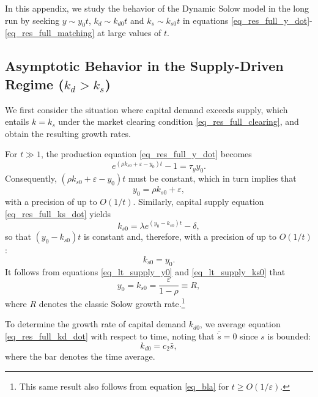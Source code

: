 
In this appendix, we study the behavior of the Dynamic Solow model in the long run by seeking $y \sim y_0 t$, $k_d \sim k_{d0} t$ and $k_s \sim k_{s0} t$ in equations \eqref{eq_res_full_y_dot}-\eqref{eq_res_full_matching} at large values of $t$.

\subsection{Asymptotic Behavior in the Supply-Driven Regime ($k_d>k_s$)}\label{subsec_supply}
We first consider the situation where capital demand exceeds supply, which entails $k=k_{s}$ under the market clearing condition \eqref{eq_res_full_clearing}, and obtain the resulting growth rates. 

For $t\gg1$, the production equation \eqref{eq_res_full_y_dot} becomes
\begin{equation}
	e^{(\rho k_{s0}+\varepsilon - y_0) t} - 1 = \tau_y y_0.
\end{equation}
Consequently, $(\rho k_{s0} + \varepsilon - y_0 )t$ must be constant, which in turn implies that 
\begin{equation}\label{eq_lt_supply_y0}
	y_0 = \rho k_{s0} + \varepsilon,
\end{equation}
with a precision of up to $O(1/t)$. Similarly, capital supply equation \eqref{eq_res_full_ks_dot} yields
\begin{equation}
	k_{s0} = \lambda e^{(y_0-k_{s0})t} - \delta,
\end{equation}
so that $(y_0 - k_{s0})t$ is constant and, therefore, with a precision of up to $O(1/t)$:
\begin{equation}\label{eq_lt_supply_ks0}
    k_{s0} = y_0.
\end{equation}
It follows from equations \ref{eq_lt_supply_y0} and \ref{eq_lt_supply_ks0} that
\begin{equation}\label{y0_solow}
	y_0 = k_{s0} = \frac{\varepsilon}{1-\rho} \equiv R,
\end{equation}
where $R$ denotes the classic Solow growth rate.\footnote{This same result also follows from equation \eqref{eq_bla} for $t{\geq}O(1/\varepsilon)$.} 

To determine the growth rate of capital demand $k_{d0}$, we average equation \eqref{eq_res_full_kd_dot} with respect to time, noting that $\bar{\dot{s}}=0$ since $s$ is bounded:
\begin{equation}\label{eq_lt_supply_kd0}
	k_{d0} = c_2 \bar{s},
\end{equation}
where the bar denotes the time average.


